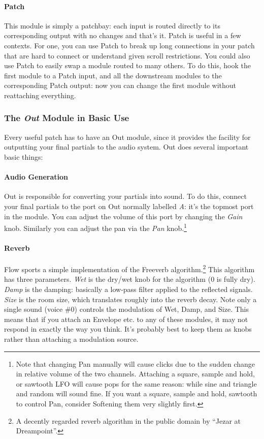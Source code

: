 \documentclass{article}
\begin{document}
\paragraph{Patch} This module is simply a patchbay: each input is routed directly to its corresponding output with no changes and that's it.  Patch is useful in a few contexts.  For one, you can use Patch to break up long connections in your patch that are hard to connect or understand given scroll restrictions. You could also use Patch to easily swap a module routed to many others.  To do this, hook the first module to a Patch input, and all the downstream modules to the corresponding Patch output: now you can change the first module without reattaching everything.

\subsubsection{The \textit{Out} Module in Basic Use}  
\label{outmodule}

Every useful patch has to have an Out module, since it provides the facility for outputting your final partials to the audio system.  Out does several important basic things:

\paragraph{Audio Generation}  Out is responsible for converting your partials into sound.  To do this, connect your final partials to the port on Out normally labelled {\it A}: it's the topmost port in the module.  You can adjust the volume of this port by changing the {\it Gain} knob.  Similarly you can adjust the pan via the {\it Pan} knob.\footnote{Note that changing Pan manually will cause clicks due to the sudden change in relative volume of the two channels.  Attaching a square, sample and hold, or sawtooth LFO will cause pops for the same reason: while sine and triangle and random will sound fine.  If you want a square, sample and hold,  sawtooth to control Pan, consider Softening them very slightly first.}

\paragraph{Reverb} Flow sports a simple implementation of the Freeverb algorithm.\footnote{A decently regarded reverb algorithm in the public domain by ``Jezar at Dreampoint''.}  This algorithm has three parameters.  {\it Wet} is the dry/wet knob for the algorithm (0 is fully dry).  {\it Damp} is the damping: basically a low-pass filter applied to the reflected signals.  {\it Size} is the room size, which translates roughly into the reverb decay.  Note only a single sound (voice \#0) controls the modulation of Wet, Damp, and Size.  This means that if you attach an Envelope etc. to any of these modules, it may not respond in exactly the way you think.  It's probably best to keep them as knobs rather than attaching a modulation source.
\end{document}
